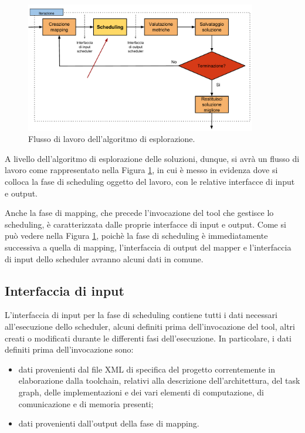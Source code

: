 \begin{figure}
 \begin{center}
  \includegraphics[width=0.9\textwidth]{capitoli/figure/cap3/MapperWorkflow.pdf}
  \caption{Flusso di lavoro dell'algoritmo di esplorazione.}
  \label{fig:mapperWorkflow}
 \end{center}
\end{figure}

A livello dell'algoritmo di esplorazione delle soluzioni, dunque, si avrà un 
flusso di lavoro come rappresentato nella Figura \ref{fig:mapperWorkflow}, in 
cui è messo in evidenza dove si colloca la fase di scheduling oggetto del 
lavoro, con le relative interfacce di input e output.

Anche la fase di mapping, che precede l'invocazione del tool che gestisce lo 
scheduling, è caratterizzata dalle proprie interfacce di input e output. Come 
si può vedere nella Figura \ref{fig:mapperWorkflow}, poichè la fase di 
scheduling è immediatamente successiva a quella di mapping, l'interfaccia di 
output del mapper e l'interfaccia di input dello scheduler avranno alcuni dati 
in comune.


\subsection{Interfaccia di input}

L'interfaccia di input per la fase di scheduling contiene tutti i dati 
necessari all'esecuzione dello scheduler, alcuni definiti prima 
dell'invocazione del tool, altri creati o modificati durante le differenti fasi 
dell'esecuzione. In particolare, i dati definiti prima dell'invocazione sono:
\begin{itemize}
 \item dati provenienti dal file XML di specifica del progetto correntemente in 
elaborazione dalla toolchain, relativi alla descrizione dell'architettura, del 
task graph, delle implementazioni e dei vari elementi di computazione, di 
comunicazione e di memoria presenti;
 \item dati provenienti dall'output della fase di mapping.
\end{itemize}

